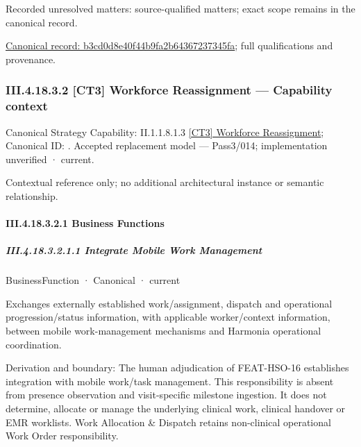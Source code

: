 {\small Recorded unresolved matters: source-qualified matters; exact scope remains in the canonical record.}\par
{\footnotesize \href{../../../../continuum/business/business-service/b3cd0d8e40f44b9fa2b64367237345fa.md}{Canonical record: b3cd0d8e40f44b9fa2b64367237345fa}; full qualifications and provenance.}\par
\subsubsection*{III.4.18.3.2 [CT3] Workforce Reassignment — Capability context}
\label{navigation:III.4.18.3.2}

{\small Canonical Strategy Capability: II.1.1.8.1.3 \hyperref[element:6e450d780ab54d129d5f648aa49edd2f]{[CT3] Workforce Reassignment}; Canonical ID: \texttt{}. Accepted replacement model — Pass3/014; implementation unverified · current.}\par
Contextual reference only; no additional architectural instance or semantic relationship.\par
\paragraph*{III.4.18.3.2.1 Business Functions}
\label{navigation:III.4.18.3.2.1}

\subparagraph*{III.4.18.3.2.1.1 Integrate Mobile Work Management}
\label{navigation:III.4.18.3.2.1.1}

\label{element:81f97ad819da48f09f26029066550e08}
{\small BusinessFunction · Canonical · current}\par

Exchanges externally established work/assignment, dispatch and operational progression/status information, with applicable worker/context information, between mobile work-management mechanisms and Harmonia operational coordination.



Derivation and boundary: The human adjudication of FEAT-HSO-16 establishes integration with mobile work/task management. This responsibility is absent from presence observation and visit-specific milestone ingestion. It does not determine, allocate or manage the underlying clinical work, clinical handover or EMR worklists. Work Allocation \& Dispatch retains non-clinical operational Work Order responsibility.


